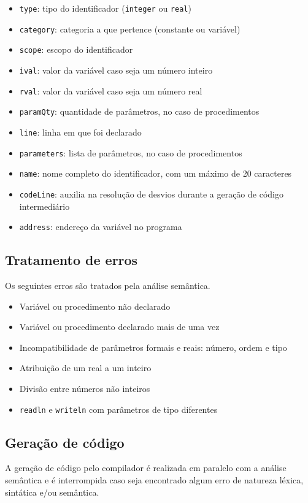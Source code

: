 \documentclass{article}
\begin{document}
		\begin{itemize}
			\item \verb=type=: tipo do identificador (\verb=integer= ou \verb=real=)
			\item \verb=category=: categoria a que pertence (constante ou variável)
			\item \verb=scope=: escopo do identificador
			\item \verb=ival=: valor da variável caso seja um número inteiro
			\item \verb=rval=: valor da variável caso seja um número real
			\item \verb=paramQty=: quantidade de parâmetros, no caso de procedimentos
			\item \verb=line=: linha em que foi declarado
			\item \verb=parameters=: lista de parâmetros, no caso de procedimentos
			\item \verb=name=: nome completo do identificador, com um máximo de 20 caracteres
			\item \verb=codeLine=: auxilia na resolução de desvios durante a geração de código intermediário
			\item \verb=address=: endereço da variável no programa
		\end{itemize}

	\subsection{Tratamento de erros} %
	\label{ssub:tratamento_de_erros}
		Os seguintes erros são tratados pela análise semântica.

		\begin{itemize}
			\item Variável ou procedimento não declarado
			\item Variável ou procedimento declarado mais de uma vez
			\item Incompatibilidade de parâmetros formais e reais: número, ordem e tipo
			\item Atribuição de um real a um inteiro
			\item Divisão entre números não inteiros
			\item \verb=readln= e \verb=writeln= com parâmetros de tipo diferentes
		\end{itemize}
	

	\subsection{Geração de código} %
	\label{sub:geracao_de_codigo}
		A geração de código pelo compilador é realizada em paralelo com a análise semântica e é interrompida caso seja encontrado algum erro de natureza léxica, sintática e/ou semântica.
\end{document}
